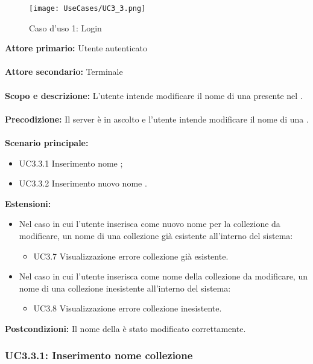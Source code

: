 \documentclass{scalatekids-article}
\begin{document}
\begin{figure}[H]
  \begin{center}
    \texttt{[image: UseCases/UC3\_3.png]}
    \caption*{Caso d'uso 1: Login}
  \end{center}
\end{figure}
\textbf{Attore primario:} Utente autenticato\\ \\
\textbf{Attore secondario:} Terminale\\ \\
\textbf{Scopo e descrizione:} L’utente intende modificare il nome di una  presente nel .\\ \\
\textbf{Precodizione:} Il server è in ascolto e l’utente intende modificare il nome di una .\\ \\
\textbf{Scenario principale:}
\begin{itemize}
\item UC3.3.1 Inserimento nome ;
\item UC3.3.2 Inserimento nuovo nome .
\end{itemize}
\textbf{Estensioni:}
\begin{itemize}
\item Nel caso in cui l'utente inserisca come nuovo nome per la collezione da modificare, un nome di una collezione già esistente all'interno del sistema:
  \begin{itemize}
  \item UC3.7 Visualizzazione errore collezione già esistente.
  \end{itemize}
\item Nel caso in cui l'utente inserisca come nome della collezione da modificare, un nome di una collezione inesistente all'interno del sistema:
  \begin{itemize}
  \item UC3.8 Visualizzazione errore collezione inesistente.
  \end{itemize}
\end{itemize}
\textbf{Postcondizioni:} Il nome della  è stato modificato correttamente.

\subsubsection{UC3.3.1: Inserimento nome collezione}
\end{document}
